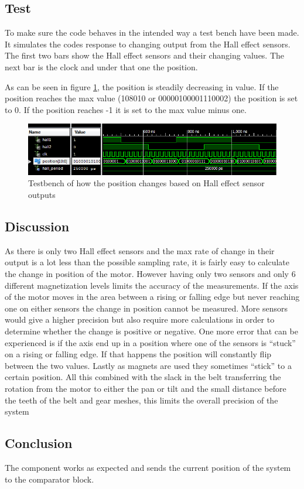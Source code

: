 \subsection{Test}
To make sure the code behaves in the intended way a test bench have been made. It simulates the codes response to changing output from the Hall effect sensors. The first two bars show the Hall effect sensors and their changing values. The next bar is the clock and under that one the position.

As can be seen in figure \ref{fig:Pos_change_testbench}, the position is steadily decreasing in value.
If the position reaches the max value (108010 or 00000100001110002) the position is set to 0. If the position reaches -1 it is set to the max value minus one.

\begin{figure}[h!]
\centering
\includegraphics[scale=0.5]{Billeder/FPGA/Pos_change_testbench.png}
\caption{ Testbench of how the position changes based on Hall effect sensor outputs }
\label{fig:Pos_change_testbench}
\end{figure}

\subsection{Discussion}
As there is only two Hall effect sensors and the max rate of change in their output is a lot less than the possible sampling rate, it is fairly easy to calculate the change in position of the motor. However having only two sensors and only 6 different magnetization levels limits the accuracy of the measurements. If the axis of the motor moves in the area between a rising or falling edge but never reaching one on either sensors the change in position cannot be measured. More sensors would give a higher precision but also require more calculations in order to determine whether the change is positive or negative.
One more error that can be experienced is if the axis end up in a position where one of the sensors is “stuck” on a rising or falling edge. If that happens the position will constantly flip between the two values.
Lastly as magnets are used they sometimes “stick” to a certain position.
All this combined with the slack in the belt transferring the rotation from the motor to either the pan or tilt and the small distance before the teeth of the belt and gear meshes, this limits the overall precision of the system

\subsection{Conclusion}

The component works as expected and sends the current position of the system to the comparator block.